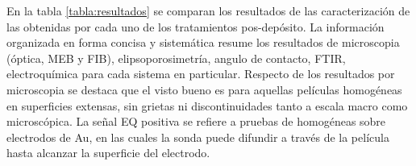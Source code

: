 	 		En la tabla \ref{tabla:resultados} se comparan los resultados de las caracterización de las \pdm\space obtenidas por cada uno de los tratamientos pos-depósito. La información organizada en forma concisa y sistemática resume los resultados de microscopia (óptica, MEB y FIB), elipsoporosimetría, angulo de contacto, FTIR, electroquímica para cada sistema en particular. Respecto de los resultados por microscopia se destaca que el visto bueno es para aquellas películas homogéneas en superficies extensas, sin grietas ni discontinuidades tanto a escala macro como microscópica. La señal EQ positiva se refiere a pruebas de \pdm\space homogéneas sobre electrodos de Au, en las cuales la sonda puede difundir a través de la película hasta alcanzar la superficie del electrodo.


	 
